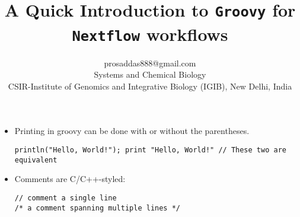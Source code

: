 \documentclass[letterpaper,11pt]{article}
\author{prosaddas888@gmail.com\\
Systems and Chemical Biology\\
CSIR-Institute of Genomics and Integrative Biology (IGIB), New Delhi, India}
\title{\vspace{-1.0cm}A Quick Introduction to \texttt{Groovy} for \texttt{Nextflow} workflows}
\begin{document}
	\maketitle
    \vspace{-0.6cm}
    \noindent
    \begin{itemize}
    
    \item Printing in groovy can be done with or without the parentheses. 
    \begin{verbatim}
println("Hello, World!"); print "Hello, World!" // These two are equivalent
    \end{verbatim}
    
    \item Comments are C/C++-styled:
    \begin{verbatim}
// comment a single line
/* a comment spanning multiple lines */
    \end{verbatim}


\end{itemize}
\end{document}
